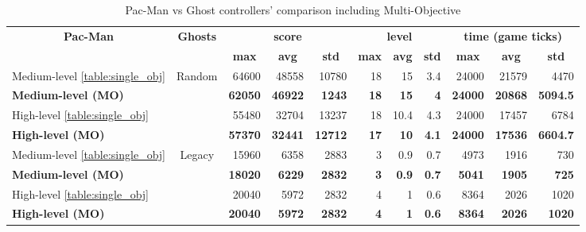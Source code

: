 \documentclass{llncs}
\newcommand{\paco}{Pac-Man }
\begin{document}
\begin{table}[tb]
\centering
\caption{\paco vs Ghost controllers' comparison including Multi-Objective}
\label{table:multi-objective}
\begin{tabular}{|l|c|r|r|r|r|r|r|r|r|r|}
\hline
\multicolumn{1}{|c|}{\multirow{2}{*}{\textbf{\paco}}} & \multirow{2}{*}{\textbf{Ghosts}} & \multicolumn{3}{c|}{\textbf{score}} & \multicolumn{3}{c|}{\textbf{level}} & \multicolumn{3}{c|}{\textbf{time (game ticks)}} \\ \cline{3-11} 
\multicolumn{1}{|c|}{} &  & \multicolumn{1}{c|}{\textbf{max}} & \multicolumn{1}{c|}{\textbf{avg}} & \multicolumn{1}{c|}{\textbf{std}} & \multicolumn{1}{c|}{\textbf{max}} & \multicolumn{1}{c|}{\textbf{avg}} & \multicolumn{1}{c|}{\textbf{std}} & \multicolumn{1}{c|}{\textbf{max}} & \multicolumn{1}{c|}{\textbf{avg}} & \multicolumn{1}{c|}{\textbf{std}} \\ \hline
Medium-level \ref{table:single_obj} & \multirow{4}{*}{Random} & {64600} & {48558} & {10780} & {18} & {15} & {3.4} & {24000} & {21579} & {4470} \\ \cline{1-1} \cline{3-11} 
\textbf{Medium-level (MO)} &  & \textbf{62050} & \textbf{46922} & \textbf{1243} & \textbf{18} & \textbf{15} & \textbf{4} & \textbf{24000} & \textbf{20868} & \textbf{5094.5} \\ \cline{1-1} \cline{3-11} 
{High-level \ref{table:single_obj}} &  & {55480} & {32704} & {13237} & {18} & {10.4} & {4.3} & {24000} & {17457} & {6784} \\ \cline{1-1} \cline{3-11} 
\textbf{High-level (MO)} &  & \textbf{57370} & \textbf{32441} & \textbf{12712} & \textbf{17} & \textbf{10} & \textbf{4.1} & \textbf{24000} & \textbf{17536} & \textbf{6604.7} \\ \hline
{Medium-level \ref{table:single_obj}} & \multirow{4}{*}{Legacy} & {15960} & {6358} & {2883} & {3} & {0.9} & {0.7} & {4973} & {1916} & {730} \\ \cline{1-1} \cline{3-11} 
\textbf{Medium-level (MO)} &  & \textbf{18020} & \textbf{6229} & \textbf{2832} & \textbf{3} & \textbf{0.9} & \textbf{0.7} & \textbf{5041} & \textbf{1905} & \textbf{725} \\ \cline{1-1} \cline{3-11} 
{High-level \ref{table:single_obj}} &  & {20040} & {5972} & {2832} & {4} & {1} & {0.6} & {8364} & {2026} & {1020} \\ \cline{1-1} \cline{3-11} 
\textbf{High-level (MO)} &  & \textbf{20040} & \textbf{5972} & \textbf{2832} & \textbf{4} & \textbf{1} & \textbf{0.6} & \textbf{8364} & \textbf{2026} & \textbf{1020} \\ \hline
\end{tabular}
\end{table}
\end{document}
